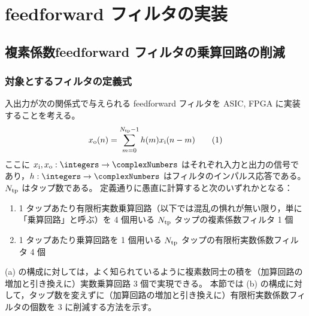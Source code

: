 \section{feedforward フィルタの実装}
    \subsection{複素係数feedforward フィルタの乗算回路の削減}
        \subsubsection{対象とするフィルタの定義式}
            \newcommand*{\xIn}{x_\text{i}}
            \newcommand*{\xOut}{x_\text{o}}
            入出力が次の関係式で与えられる feedforward フィルタを ASIC, FPGA に実装することを考える。
            \[ \xOut(n) = \sum_{m=0}^{\Ntp-1} h(m)\xIn(n-m) \tag{1} \]
            ここに $\xIn,\xOut:\integers\to\complexNumbers$ はそれぞれ入力と出力の信号であり，$h:\integers\to\complexNumbers$ はフィルタのインパルス応答である。$N_{\text{tp}}$ はタップ数である。
            定義通りに愚直に計算すると次のいずれかとなる：
            \begin{enumerate}[label=(\alph*)]
                \item 1 タップあたり有限桁実数乗算回路（以下では混乱の惧れが無い限り，単に「乗算回路」と呼ぶ）を 4 個用いる $N_{\text{tp}}$ タップの複素係数フィルタ 1 個
                \item 1 タップあたり乗算回路を 1 個用いる $N_{\text{tp}}$ タップの有限桁実数係数フィルタ 4 個
            \end{enumerate}
            (a) の構成に対しては，よく知られているように複素数同士の積を（加算回路の増加と引き換えに）実数乗算回路 3 個で実現できる。
            本節では (b) の構成に対して，タップ数を変えずに（加算回路の増加と引き換えに）有限桁実数係数フィルタの個数を 3 に削減する方法を示す。

